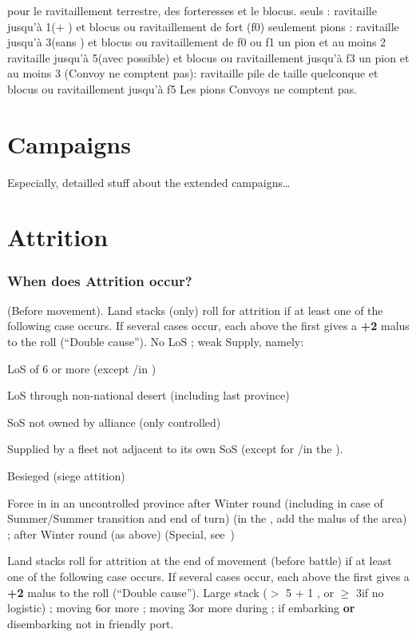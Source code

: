  pour le ravitaillement terrestre, des
forteresses et le blocus.
\bparag \de seuls : ravitaille jusqu'à 1\DT (+ \LDE) et blocus ou ravitaillement de fort (f0) seulement
\bparag pions \DN : ravitaille jusqu'à 3\DT (sans \ARMY) et blocus ou ravitaillement de f0 ou f1
\bparag un pion \FLEET et au moins 2 \ND ravitaille jusqu'à 5\DT (avec \ARMY possible) et blocus ou ravitaillement jusqu'à f3
\bparag un pion \FLEET\faceplus et au moins 3 \ND (Convoy ne comptent pas): ravitaille pile
de taille quelconque et blocus ou ravitaillement jusqu'à f5
\bparag Les pions Convoys ne comptent pas.

\section{Campaigns}
Especially, detailled stuff about the extended campaigns\ldots

\section{Attrition}
\subsubsection{When does Attrition occur?}
 (Before movement). Land stacks (only) roll for
attrition if at least one of the following case occurs. If several cases
occur, each above the first gives a \textbf{+2} malus to the roll (``Double
cause'').
\bparag No LoS ;
\bparag weak Supply, namely:
\begin{modlist}
\item LoS of 6 or more \MP (except \LD/\LDE in \ROTW)
\item LoS through non-national desert (including last province)
\item SoS not owned by alliance (only controlled)
\item Supplied by a fleet not adjacent to its own SoS (except for
  \LD/\LDE in the \ROTW).
\item Besieged (siege attition)
\end{modlist}
\bparag Force in  in an uncontrolled province after Winter
round (including in case of Summer/Summer transition and end of turn) (in the
\ROTW, add the malus of the area) ;
\bparag \Timar after Winter round (as above) (Special,
see~)

 Land stacks roll for attrition at the end of
movement (before battle) if at least one of the following case occurs. If
several cases occur, each above the first gives a \textbf{+2} malus to the
roll (``Double cause'').
\bparag Large stack ($>$ 5 \LD + 1 \Pasha, or $\geq$ 3\LD if no logistic) ;
\bparag moving 6\MP or more ;
\bparag moving 3\MP or more during  ;
\bparag if embarking \textbf{or} disembarking not in friendly port.

